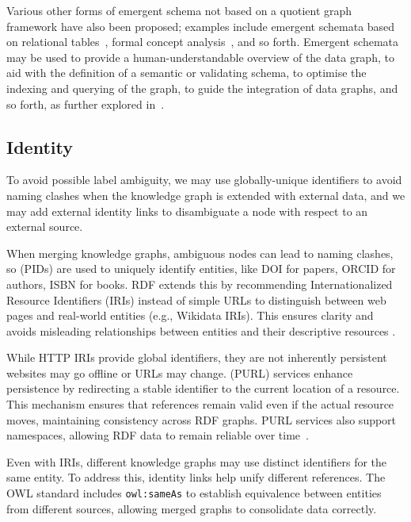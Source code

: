 Various other forms of emergent schema not based on a quotient graph framework have also been proposed; examples include emergent schemata based on relational tables~\cite{Pham2015EmergenSchemaFromRDF}, formal concept analysis~\cite{Gonzalez2018ModellingDynamicsSemanticWebKGFormalConceptAnalysis}, and so forth. Emergent schemata may be used to provide a human-understandable overview of the data graph, to aid with the definition of a semantic or validating schema, to optimise the indexing and querying of the graph, to guide the integration of data graphs, and so forth, as further explored in~\cite{Cebiric2019SummarizingSemanticGraphs}.

\subsection{Identity}\label{identity}
To avoid possible label ambiguity, we may use globally-unique identifiers to avoid naming clashes when the knowledge graph is extended with external data, and we may add external identity links to disambiguate a node with respect to an external source.

When merging knowledge graphs, ambiguous nodes can lead to naming clashes, so  (PIDs) are used to uniquely identify entities, like DOI for papers, ORCID for authors, ISBN for books. RDF extends this by recommending Internationalized Resource Identifiers (IRIs) instead of simple URLs to distinguish between web pages and real-world entities (e.g., Wikidata IRIs). This ensures clarity and avoids misleading relationships between entities and their descriptive resources \cite{Hakala2010PIDs}.

While HTTP IRIs provide global identifiers, they are not inherently persistent websites may go offline or URLs may change.  (PURL) services enhance persistence by redirecting a stable identifier to the current location of a resource. This mechanism ensures that references remain valid even if the actual resource moves, maintaining consistency across RDF graphs. PURL services also support namespaces, allowing RDF data to remain reliable over time~\cite{BernersLee2006LinkedData}\cite{Heath2011LinkedData}.

Even with IRIs, different knowledge graphs may use distinct identifiers for the same entity. To address this, identity links help unify different references. The OWL standard includes \texttt{owl:sameAs} to establish equivalence between entities from different sources, allowing merged graphs to consolidate data correctly.

